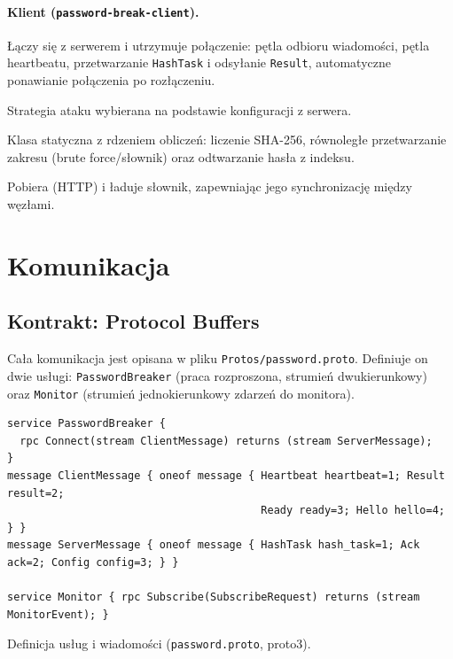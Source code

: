 \documentclass[11pt,a4paper]{article}
\begin{document}
\paragraph{Klient (\texttt{password-break-client}).}
\begin{description}[style=nextline,leftmargin=0pt,itemsep=2pt]
  \item[\texttt{GrpcClient}] Łączy się z serwerem i utrzymuje połączenie: pętla odbioru
        wiadomości, pętla heartbeatu, przetwarzanie \texttt{HashTask} i odsyłanie \texttt{Result},
        automatyczne ponawianie połączenia po rozłączeniu.
  \item[\texttt{IClientAttackStrategy} (\texttt{BruteForceClientStrategy}, \texttt{DictionaryClientStrategy})]
        Strategia ataku wybierana na podstawie konfiguracji z serwera.
  \item[\texttt{HashWorker}] Klasa statyczna z rdzeniem obliczeń: liczenie SHA-256, równoległe
        przetwarzanie zakresu (brute force/słownik) oraz odtwarzanie hasła z indeksu.
  \item[\texttt{WordlistManager} (\texttt{IWordlistManager})] Pobiera (HTTP) i ładuje słownik,
        zapewniając jego synchronizację między węzłami.
\end{description}

\section{Komunikacja}

\subsection{Kontrakt: Protocol Buffers}
Cała komunikacja jest opisana w pliku \texttt{Protos/password.proto}. Definiuje on dwie usługi:
\texttt{PasswordBreaker} (praca rozproszona, strumień dwukierunkowy) oraz \texttt{Monitor}
(strumień jednokierunkowy zdarzeń do monitora).

\begin{listing}[H]
\begin{verbatim}
service PasswordBreaker {
  rpc Connect(stream ClientMessage) returns (stream ServerMessage);
}
message ClientMessage { oneof message { Heartbeat heartbeat=1; Result result=2;
                                        Ready ready=3; Hello hello=4; } }
message ServerMessage { oneof message { HashTask hash_task=1; Ack ack=2; Config config=3; } }

service Monitor { rpc Subscribe(SubscribeRequest) returns (stream MonitorEvent); }
\end{verbatim}
\caption{Definicja usług i wiadomości (\texttt{password.proto}, proto3).}
\end{listing}
\end{document}
